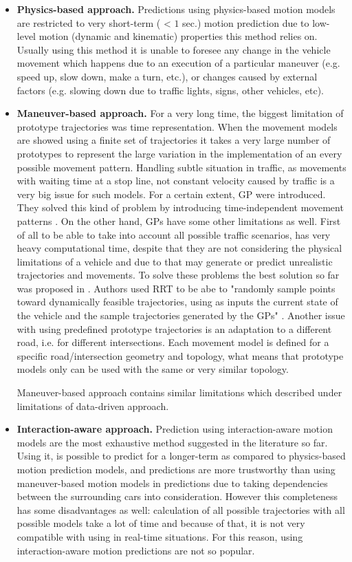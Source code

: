 \begin{itemize}
	\item \textbf{Physics-based approach.} Predictions using physics-based motion models are restricted to very short-term ( < $1$ sec.) motion prediction due to low-level motion (dynamic and kinematic) properties this method relies on. Usually using this method it is  unable to foresee any change in the vehicle movement which happens due to an execution of a particular maneuver (e.g. speed up, slow down, make a turn, etc.), or changes caused by external factors (e.g. slowing down due to traffic lights, signs, other vehicles, etc).
	
	\item \textbf{Maneuver-based approach.} For a very long time, the biggest limitation of prototype trajectories was time representation. When the movement models are showed using a finite set of trajectories it takes a very large number of prototypes to represent the large variation
	in the implementation of an every possible movement pattern. Handling subtle situation in traffic, as movements with waiting time at a stop line, not constant velocity caused by traffic is a very big issue for such models. For a certain extent, \gls{GP} were introduced. They solved this kind of problem by introducing time-independent movement patterns \cite{DataDrivenIII}. On the other hand, \glspl{GP} have some other limitations as well. First of all to be able to take into account all possible traffic scenarios, has very heavy computational time, despite that they are not considering the physical limitations of a vehicle and due to that may generate or predict unrealistic trajectories and movements. To solve these problems the best solution so far was proposed in \cite{RRT}. Authors used \gls{RRT} to be abe to "randomly sample points toward dynamically feasible trajectories, using as inputs the current state of the vehicle and the sample trajectories generated by the \glspl{GP}"  \cite{RRT}. Another issue with using predefined prototype trajectories is an adaptation to a different road, i.e. for different intersections. Each movement model is defined for a specific road/intersection geometry and topology, what means that prototype models only can be used with the same or very similar topology. 
	
	Maneuver-based approach contains similar limitations which described under limitations of data-driven approach.
	
	\item \textbf{Interaction-aware approach.} Prediction using interaction-aware motion models are the most exhaustive method suggested in the literature so far. Using it, is possible to predict for a longer-term as compared to physics-based motion prediction models, and predictions are more trustworthy than using maneuver-based motion models in predictions due to taking dependencies between the surrounding cars into consideration. However this completeness has some disadvantages as well:  calculation of all possible trajectories with all possible models take a lot of time and because of that, it is not very compatible with using in real-time situations. For this reason, using interaction-aware motion predictions are not so popular. 
	

\end{itemize}
